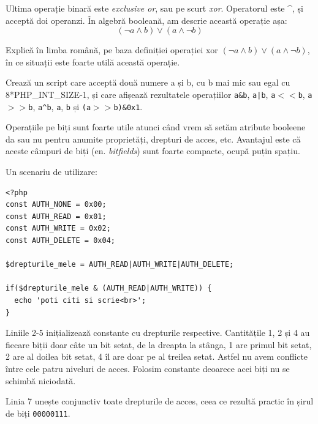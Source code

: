 Ultima operație binară este \textsl{exclusive or}, sau pe scurt
\textsl{xor}. Operatorul este \textasciicircum, și
acceptă doi operanzi. În algebră booleană, am descrie această operație așa:
\[(\lnot a \land b) \lor (a \land \lnot b)\]

\begin{Exercise}[title={Jonglează cu expresii boolene},difficulty=3]
Explică în limba română, pe baza definiției operației xor
$(\lnot a \land b) \lor (a \land \lnot b)$,
în ce situații este foarte utilă această operație.
\end{Exercise}


\begin{Exercise}[title={Operații pe biți}]
Crează un script care acceptă două numere a și b, cu b mai mic sau egal cu 8*PHP\_INT\_SIZE-1, și
care afișează rezultatele operațiilor \texttt{a\&b}, \texttt{a|b}, \texttt{a$<<$b},
\texttt{a$>>$b}, \texttt{a{\textasciicircum}b},
\texttt{{\texttildelow}a}, \texttt{{\texttildelow}b} și \texttt{(a$>>$b)\&0x1}.
\end{Exercise}

Operațiile pe biți sunt foarte utile atunci când vrem să setăm atribute booleene {\glqq}da sau nu{\grqq}
pentru anumite proprietăți, drepturi de acces, etc. Avantajul este că aceste câmpuri de biți
(en. \textsl{bitfields}) sunt foarte compacte, ocupă puțin spațiu.

Un scenariu de utilizare:
\begin{lstlisting}
<?php
const AUTH_NONE = 0x00;
const AUTH_READ = 0x01;
const AUTH_WRITE = 0x02;
const AUTH_DELETE = 0x04;

$drepturile_mele = AUTH_READ|AUTH_WRITE|AUTH_DELETE;

if($drepturile_mele & (AUTH_READ|AUTH_WRITE)) {
  echo 'poti citi si scrie<br>';
}
\end{lstlisting}
Liniile 2-5 inițializează constante cu drepturile respective.  Cantitățile 1, 2 și 4
au fiecare biții doar câte un bit setat, de la dreapta la stânga, 1 are primul bit setat,
2 are al doilea bit setat, 4 îl are doar pe al treilea setat. Astfel nu avem conflicte
între cele patru niveluri de acces. Folosim constante
deoarece acei biți nu se schimbă niciodată.

Linia 7 unește conjunctiv toate drepturile de acces, ceea ce rezultă practic în șirul
de biți \texttt{00000111}.

